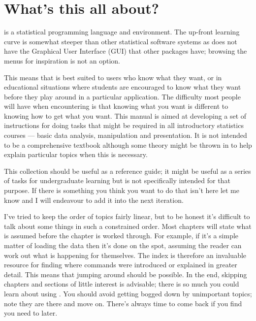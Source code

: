 



 
\chapter{What's this all about?} 
\label{Intro} 
 


 
\R{} is a statistical programming language and environment. The up-front learning curve is somewhat steeper than other statistical software systems as \R{} does not have the Graphical User Interface (GUI) that other packages have; browsing the menus for inspiration is not an option. 
 
This means that \R{} is best suited to users who know what they want, or in educational situations where students are encouraged to know what they want before they play around in a particular application. The difficulty most people will have when encountering \R{} is that knowing what you want is different to knowing how to get what you want. This manual is aimed at developing a set of instructions for doing tasks that might be required in all introductory statistics courses --- basic data analysis, manipulation and presentation. It is not intended to be a comprehensive textbook although some theory might be thrown in to help explain particular topics when this is necessary. 
 
This collection should be useful as a reference guide; it might be useful as a series of tasks for undergraduate learning but is not specifically intended for that purpose. If there is something you think you want to do that isn't here let me know and I will endeavour to add it into the next iteration. 
 
I've tried to keep the order of topics fairly linear, but to be honest it's difficult to talk about some things in such a constrained order. Most chapters will state what is assumed before the chapter is worked through. For example, if it's a simple matter of loading the data then it's done on the spot, assuming the reader can work out what is happening for themselves. The index is therefore an invaluable resource for finding where commands were introduced or explained in greater detail. This means that jumping around should be possible.  
In the end, skipping chapters and sections of little interest is advisable; there is so much you could learn about using \R{}. You should avoid getting bogged down by unimportant topics; note they are there and move on. There's always time to come back if you find you need to later. 
 
